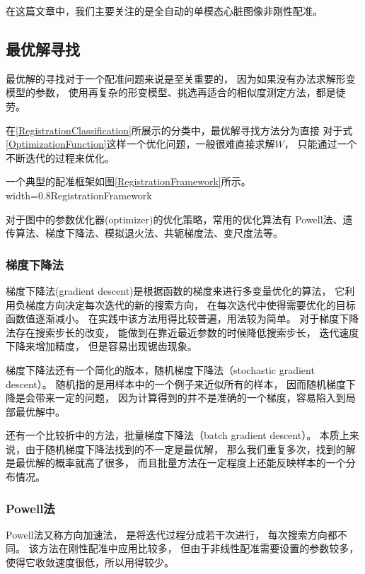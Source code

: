 在这篇文章中，我们主要关注的是全自动的单模态心脏图像非刚性配准。





\subsection{最优解寻找}\label{SectionOptimization}
最优解的寻找对于一个配准问题来说是至关重要的，
因为如果没有办法求解形变模型的参数，
使用再复杂的形变模型、挑选再适合的相似度测定方法，都是徒劳。

在\ref{RegistrationClassification}所展示的分类中，最优解寻找方法分为直接
对于式\ref{OptimizationFunction}这样一个优化问题，一般很难直接求解$W$，
只能通过一个不断迭代的过程来优化。

一个典型的配准框架如图\ref{RegistrationFramework}所示。
%
{width=0.8\textwidth}{RegistrationFramework}

对于图中的参数优化器(optimizer)的优化策略，常用的优化算法有
Powell法、遗传算法、梯度下降法、模拟退火法、共轭梯度法、变尺度法等。
\subsubsection{梯度下降法}
梯度下降法(gradient descent)是根据函数的梯度来进行多变量优化的算法，
它利用负梯度方向决定每次迭代的新的搜索方向，
在每次迭代中使得需要优化的目标函数值逐渐减小。
在实践中该方法用得比较普遍，用法较为简单。
对于梯度下降法存在搜索步长的改变，
能做到在靠近最近参数的时候降低搜索步长，
迭代速度下降来增加精度，
但是容易出现锯齿现象。

梯度下降法还有一个简化的版本，随机梯度下降法（stochastic gradient descent）。
随机指的是用样本中的一个例子来近似所有的样本，
因而随机梯度下降是会带来一定的问题，
因为计算得到的并不是准确的一个梯度，容易陷入到局部最优解中。

还有一个比较折中的方法，批量梯度下降法（batch gradient descent）。
本质上来说，由于随机梯度下降法找到的不一定是最优解，
那么我们重复多次，找到的解是最优解的概率就高了很多，
而且批量方法在一定程度上还能反映样本的一个分布情况。

\subsubsection{Powell法}
Powell法又称方向加速法，
是将迭代过程分成若干次进行，
每次搜索方向都不同。
该方法在刚性配准中应用比较多，
但由于非线性配准需要设置的参数较多，
使得它收敛速度很低，所以用得较少。

